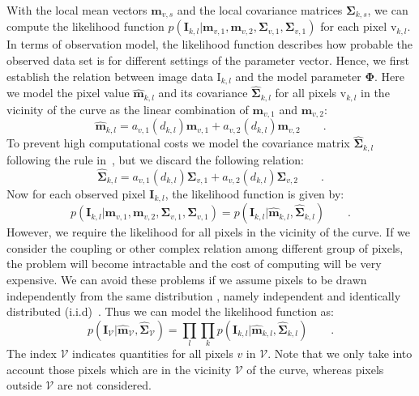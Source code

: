\documentclass[conference]{IEEEtran}
\begin{document}
With the local mean vectors $\mathbf{m}_{v,s}$  and the local covariance matrices
$\mathbf{\Sigma}_{k,s}$, we can compute the
likelihood function   $p(\mathbf{I}_{k,l} | \mathbf{m}_{v,1}, \mathbf{m}_{v,2},
  \mathbf{\Sigma}_{v,1}, \mathbf{\Sigma}_{v,1})$ for each pixel
  $\mathrm{v}_{k,l}$. In terms of observation model, the likelihood
  function describes how probable the observed data set is for
  different settings of the parameter vector. Hence, we first establish
  the relation between image data $\mathrm{I}_{k,l}$ and the model
  parameter $\mathbf{\Phi}$. Here we model the pixel value
  $\hat{\mathbf{m}}_{k,l}$ and its covariance $\hat{\mathbf{\Sigma}}_{k,l}$
  for all pixels $\mathrm{v}_{k,l}$ in the vicinity of the curve as the
  linear combination of $\mathbf{m}_{v,1}$ and $\mathbf{m}_{v,2}$:
  \begin{equation}
    \label{eq:meankl}
    \hat{\mathbf{m}}_{k,l} = a_{v,1}(d_{k,l})\mathbf{m}_{v,1} + a_{v,2}(d_{k,l})\mathbf{m}_{v,2}\qquad.
  \end{equation}
To prevent high computational costs we model the covariance matrix $\hat{\mathbf{\Sigma}}_{k,l}$ following the
rule in~\cite{hanek2004fitting}, but we discard the following relation:
\begin{equation}
  \label{eq:sigmakl}
  \hat{\mathbf{\mathbf{\Sigma}}}_{k,l} = a_{v,1}(d_{k,l})\mathbf{\Sigma}_{v,1} + a_{v,2}(d_{k,l})\mathbf{\Sigma}_{v,2}\qquad.
\end{equation}
Now for each observed pixel $\mathbf{I}_{k,l}$, the likelihood
function is given by:
\begin{equation}
  \label{eq:likelihood}
p(\mathbf{I}_{k,l} | \mathbf{m}_{v,1}, \mathbf{m}_{v,2},
  \mathbf{\Sigma}_{v,1}, \mathbf{\Sigma}_{v,1}) = p(\mathbf{I}_{k,l} | \hat{\mathbf{\mathbf{m}}}_{k,l},\hat{\mathbf{\mathbf{\Sigma}}}_{k,l}) \qquad.
\end{equation}
However, we require the likelihood for all pixels in the vicinity of
the curve. If we consider the coupling or other complex relation among
different group of pixels, the problem will become intractable and the cost of computing will be very expensive. We can
avoid these problems if we assume pixels to be drawn independently from the same distribution
, namely independent and identically distributed
(i.i.d)~\cite{bishop2006pattern}. Thus we can model the likelihood function as:
\begin{equation}
  \label{eq:liklihoodall}
  p(\mathbf{I}_{\mathcal{V}} |
  \hat{\mathbf{\mathbf{m}}}_{\mathcal{V}},\hat{\mathbf{\mathbf{\Sigma}}}_{\mathcal{V}})
  = \prod_l \prod_k p(\mathbf{I}_{k,l} | \hat{\mathbf{\mathbf{m}}}_{k,l},\hat{\mathbf{\mathbf{\Sigma}}}_{k,l}) \qquad.
\end{equation}
The index $\mathcal{V}$ indicates quantities for all pixels $v$ in
$\mathcal{V}$. Note that we only take into account those pixels which are
in the vicinity $\mathcal{V}$ of the curve, whereas pixels outside
$\mathcal{V}$ are not considered.
\end{document}
